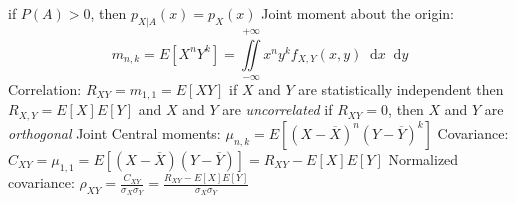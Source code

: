 \documentclass[a4paper,11pt]{article}
\newcommand*\dd{\mathop{}\!\mathrm{d}}
\begin{document}
\begin{outline}[enumerate]
			\2 if $P\left(A\right) > 0$, then $p_{X | A}\left(x\right) = p_{X}\left(x\right)$
		\1 Joint moment about the origin:
			\begin{equation}
				m_{n, k} = E\left[X^{n} Y^{k}\right] = \iint
				\limits_{-\infty}^{+\infty} x^{n} y^{k} f_{X, Y} \left(x, y\right) \dd x \dd y
			\end{equation}	
		\1 Correlation: $R_{XY} = m_{1, 1} = E\left[XY\right]$	
			\2 if $X$ and $Y$ are statistically independent then $R_{X, Y} = E\left[X\right]E\left[Y\right]$ and $X$ and $Y$ are \textit{uncorrelated}
			\2 if $R_{XY} = 0$, then $X$ and $Y$ are \textit{orthogonal}
		\1 Joint Central moments: $\mu_{n, k} = E\left[\left(X - \overline{X}\right)^{n} \left(Y - \overline{Y}\right)^{k} \right]$	
			\2 Covariance: $C_{XY} = \mu_{1, 1} = E\left[\left(X - \overline{X}\right) \left(Y - \overline{Y}\right) \right] = R_{XY} - E\left[X\right]E\left[Y\right]$
			\2 Normalized covariance: $\rho_{XY} = \frac{C_{XY}}{\sigma_{X}\sigma_{Y}} = \frac{R_{XY} - E\left[X\right]E\left[Y\right]}{\sigma_{X}\sigma_{Y}}$
	\end{outline}
	
\end{document}
